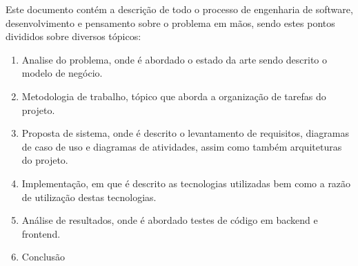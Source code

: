 Este documento contém a descrição de todo o processo de engenharia de software, desenvolvimento e 
pensamento sobre o problema em mãos, sendo estes pontos divididos sobre diversos tópicos:
\begin{enumerate}
    \item Analise do problema, onde é abordado o estado da arte sendo descrito o modelo de negócio.
    \item Metodologia de trabalho, tópico que aborda a organização de tarefas do projeto.
    \item Proposta de sistema, onde é descrito o levantamento de requisitos, diagramas 
    de caso de uso e diagramas de atividades, assim como também arquiteturas do projeto.
    \item Implementação, em que é descrito as tecnologias utilizadas bem como a razão de utilização 
    destas tecnologias.
    \item Análise de resultados, onde é abordado testes de código em backend e frontend.
    \item Conclusão
\end{enumerate}


